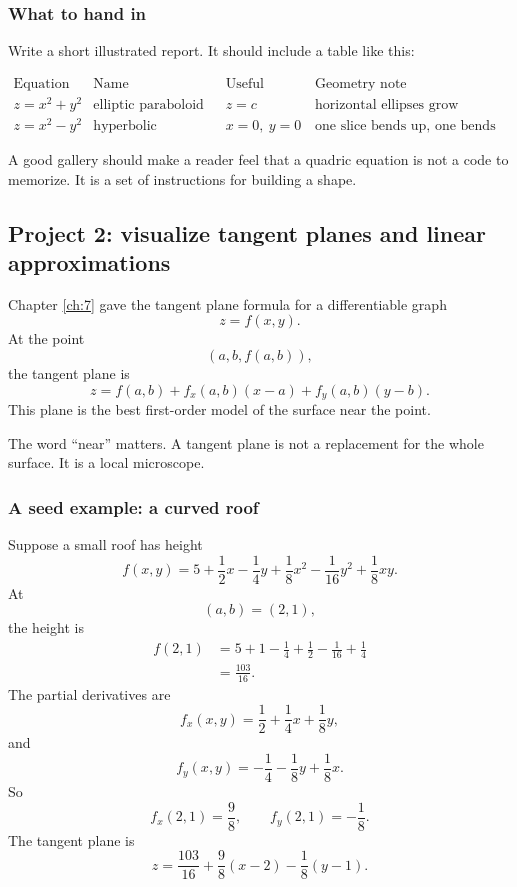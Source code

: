 \subsubsection*{What to hand in}

Write a short illustrated report.  It should include a table like this:

\[
\begin{array}{c|c|c|c}
\text{Equation} & \text{Name} & \text{Useful traces} & \text{Geometry note} \\ \hline
z=x^2+y^2 & \text{elliptic paraboloid} &
z=c & \text{horizontal ellipses grow upward}\\[1mm]
z=x^2-y^2 & \text{hyperbolic paraboloid} &
x=0,\ y=0 & \text{one slice bends up, one bends down}
\end{array}
\]

A good gallery should make a reader feel that a quadric equation is not a code to
memorize.  It is a set of instructions for building a shape.

\subsection{Project 2: visualize tangent planes and linear approximations}

Chapter \ref{ch:7} gave the tangent plane formula for a differentiable graph
\[
    z=f(x,y).
\]
At the point
\[
    (a,b,f(a,b)),
\]
the tangent plane is
\[
\boxed{
    z=f(a,b)+f_x(a,b)(x-a)+f_y(a,b)(y-b).
}
\]
This plane is the best first-order model of the surface near the point.

The word ``near'' matters.  A tangent plane is not a replacement for the whole surface.
It is a local microscope.

\subsubsection*{A seed example: a curved roof}

Suppose a small roof has height
\[
    f(x,y)=5+\frac12x-\frac14y+\frac18x^2-\frac1{16}y^2+\frac18xy.
\]
At
\[
    (a,b)=(2,1),
\]
the height is
\[
\begin{aligned}
    f(2,1)
    &=
    5+1-\frac14+\frac12-\frac1{16}+\frac14\\
    &=
    \frac{103}{16}.
\end{aligned}
\]
The partial derivatives are
\[
    f_x(x,y)=\frac12+\frac14x+\frac18y,
\]
and
\[
    f_y(x,y)=-\frac14-\frac18y+\frac18x.
\]
So
\[
    f_x(2,1)=\frac98,
    \qquad
    f_y(2,1)=-\frac18.
\]
The tangent plane is
\[
\boxed{
    z=\frac{103}{16}+\frac98(x-2)-\frac18(y-1).
}
\]

